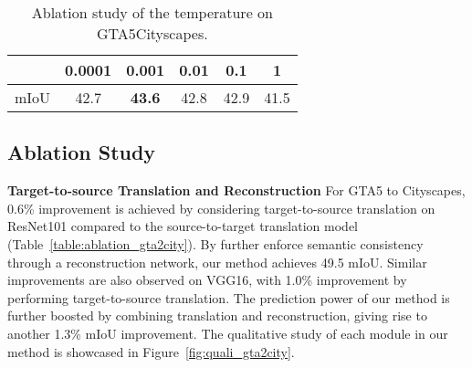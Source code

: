 \documentclass[runningheads]{llncs}
\begin{document}
	\begin{table}[t]
		\caption{Ablation study of the temperature  on GTA5Cityscapes.}
		\label{table:ablation_temperature}
		
		\footnotesize
		\setlength\tabcolsep{10pt}
		\begin{center}
			\begin{tabularx}{.7\textwidth}{ cccccc @{} }
				\toprule
 & 0.0001 & 0.001 & 0.01 & 0.1 & 1 \\
				\midrule
				mIoU & 42.7 & \bf 43.6 & 42.8 & 42.9 & 41.5 \\
				\bottomrule
			\end{tabularx}
		\end{center}
	\end{table}
	
	\subsection{Ablation Study}
	
	{\textbf{Target-to-source Translation and Reconstruction}} For GTA5 to Cityscapes, 0.6\% improvement is achieved by considering target-to-source translation on ResNet101 compared to the source-to-target translation model (Table~\ref{table:ablation_gta2city}). By further enforce semantic consistency through a reconstruction network, our method achieves 49.5 mIoU. Similar improvements are also observed on VGG16, with 1.0\% improvement by performing target-to-source translation. The prediction power of our method is further boosted by combining translation and reconstruction, giving rise to another 1.3\% mIoU improvement. The qualitative study of each module in our method is showcased in Figure~\ref{fig:quali_gta2city}.
	\begin{comment}
		\begin{table}
		\caption{Ablation study on SYNTHIACityscapes.}
		\label{table:ablation_synthia2city}
		
		\footnotesize
		\setlength\tabcolsep{5pt}
		\begin{center}
			\begin{tabularx}{.59\textwidth}{ cccc|c @{} }
				\toprule
Base & ST &  TS & Reconstruction & \bf mIoU \\
				\midrule
R & \cmark & & & 51.4 \\
				R & & \cmark & & 52.0 \\
				R & & \cmark & \cmark & 53.1 \\
				
				\midrule
V & \cmark & & & 39.0 \\
				V & & \cmark & & 40.1 \\
				V & & \cmark & \cmark & 41.1 \\
				
				\bottomrule
			\end{tabularx}
		\end{center}
\end{table}
	\end{comment}
	
\end{document}
